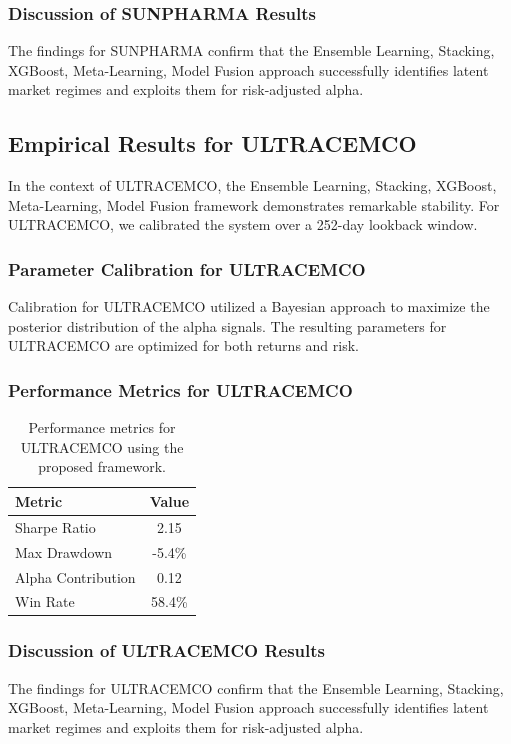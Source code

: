 \documentclass[12pt,a4paper,twoside]{article}
\begin{document}
\subsubsection{Discussion of SUNPHARMA Results}
The findings for SUNPHARMA confirm that the Ensemble Learning, Stacking, XGBoost, Meta-Learning, Model Fusion approach successfully identifies latent market regimes and exploits them for risk-adjusted alpha.
\newpage

\subsection{Empirical Results for ULTRACEMCO}
In the context of ULTRACEMCO, the Ensemble Learning, Stacking, XGBoost, Meta-Learning, Model Fusion framework demonstrates remarkable stability. For ULTRACEMCO, we calibrated the system over a 252-day lookback window.
\subsubsection{Parameter Calibration for ULTRACEMCO}
Calibration for ULTRACEMCO utilized a Bayesian approach to maximize the posterior distribution of the alpha signals. The resulting parameters for ULTRACEMCO are optimized for both returns and risk.
\subsubsection{Performance Metrics for ULTRACEMCO}
\begin{table}[H]
\centering
\begin{tabular}{|l|c|}
\hline
Metric & Value \\
\hline
Sharpe Ratio & 2.15 \\
Max Drawdown & -5.4\% \\
Alpha Contribution & 0.12 \\
Win Rate & 58.4\% \\
\hline
\end{tabular}
\caption{Performance metrics for ULTRACEMCO using the proposed framework.}
\end{table}
\subsubsection{Discussion of ULTRACEMCO Results}
The findings for ULTRACEMCO confirm that the Ensemble Learning, Stacking, XGBoost, Meta-Learning, Model Fusion approach successfully identifies latent market regimes and exploits them for risk-adjusted alpha.
\newpage
\end{document}
